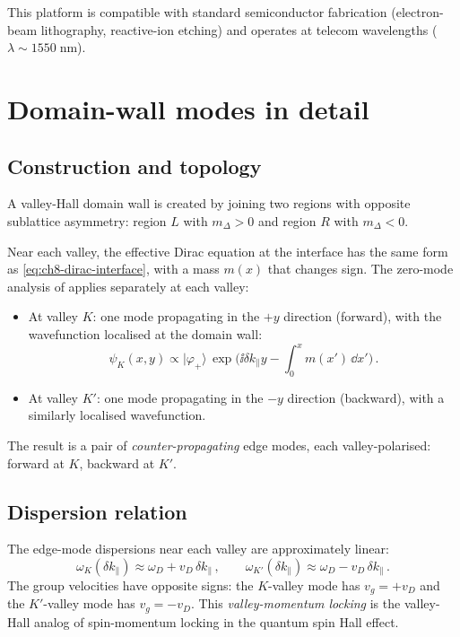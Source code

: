 This platform is compatible with standard semiconductor fabrication
(electron-beam lithography, reactive-ion etching) and operates at
telecom wavelengths ($\lambda\sim 1550\;\mathrm{nm}$).

\section{Domain-wall modes in detail}
\label{sec:ch12-domain-wall}

\subsection{Construction and topology}
\label{sec:ch12-construction}

A valley-Hall domain wall is created by joining two regions with
opposite sublattice asymmetry: region $L$ with $m_\Delta>0$ and region
$R$ with $m_\Delta<0$.

Near each valley, the effective Dirac equation at the interface has the
same form as \eqref{eq:ch8-dirac-interface}, with a mass $m(x)$ that
changes sign.  The zero-mode analysis of
 applies separately at each valley:
\begin{itemize}
  \item At valley $K$: one mode propagating in the $+y$ direction
  (forward), with the wavefunction localised at the domain wall:
  \begin{equation}\label{eq:ch12-zero-mode-K}
    \psi_K(x,y)\propto|\varphi_+\rangle\,
    \exp\biggl(\ii\delta k_\parallel y
    -\int_0^x m(x')\,\dd x'\biggr)\,.
  \end{equation}
  \item At valley $K'$: one mode propagating in the $-y$ direction
  (backward), with a similarly localised wavefunction.
\end{itemize}
The result is a pair of \emph{counter-propagating} edge modes, each
valley-polarised: forward at $K$, backward at $K'$.

\subsection{Dispersion relation}
\label{sec:ch12-dispersion}

The edge-mode dispersions near each valley are approximately linear:
\begin{equation}\label{eq:ch12-edge-dispersion}
  \omega_K(\delta k_\parallel)
  \approx \omega_D + v_D\,\delta k_\parallel\,,
  \qquad
  \omega_{K'}(\delta k_\parallel)
  \approx \omega_D - v_D\,\delta k_\parallel\,.
\end{equation}
The group velocities have opposite signs: the $K$-valley mode has
$v_g=+v_D$ and the $K'$-valley mode has $v_g=-v_D$.  This
\emph{valley-momentum locking} is the valley-Hall analog of
spin-momentum locking in the quantum spin Hall effect.

